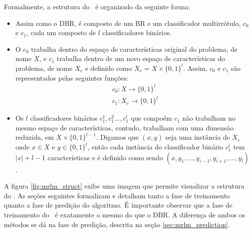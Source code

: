 Formalmente, a estrutura do \MRLMa~é organizado da seguinte forma:
\begin{itemize}
  \item Assim como o DBR, é composto de um BR e um classificador multirrótulo, $c_0$ e $c_1$,
  cada um composto de $l$ classificadores binários.
  \item O $c_0$ trabalha dentro do espaço de características original do problema, de nome $X$,
  e $c_1$ trabalha dentro de um novo espaço de características do problema, de nome $X_e$ e
   definido como $X_e=X \times \{0,1\}^{l}$. Assim, $c_0$ e $c_1$ são
  representados pelas seguintes funções:
  \begin{equation}
  \begin{split}
   & c_0 : X \rightarrow \{0,1\}^l \\
   & c_1 : X_e \rightarrow \{0,1\}^l
   \end{split}
  \end{equation}
  \item Os $l$ classificadores binários $c_1^1,c_1^2...,c_1^l$ que compoêm $c_1$ não trabalham no mesmo
  espaço de características, contudo,
  trabalham com uma dimensão reduzida, em $X \times \{0,1\}^{l-1}$. Digamos que $(x,y)$ seja uma instância de $X_e$
  onde $x \in X$ e $y \in {\{0,1\}}^l$, então cada instância 
  do classificador binário $c_1^i$ tem $|x|+l-1$ características e é definido como sendo $(x,y_1,...,y_{i-1},y_{i+1},...,y_{l})$.

  
%   
  
\end{itemize}
  A figura \ref{fig:mrlm_struct} exibe uma imagem que permite visualizar a estrutura do \MRLMa.
  As seções seguintes formalizam e detalham tanto a fase de treinamento quanto a fase de predição do algoritmo.
  É importante observar que a fase de treinamento do \MRLMa~é exatamente o mesmo do que o DBR.
  A diferença de ambos os métodos se dá na fase de predição, descrita na seção \ref{sec:mrlm_prediction}.
 
